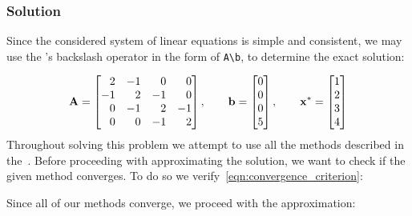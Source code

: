 \subsubsection*{Solution}
Since the considered system of linear equations is simple and consistent, we may use the
\MATLAB's backslash operator in the form of \lstinline[style=Matlab-editor]{A\b}, to
determine the exact solution:

\begin{equation*}
  \mathbf{A} = \begin{bmatrix}
    \phantom{-}2 & -1 & \phantom{-}0 & \phantom{-}0 \\
    -1 & \phantom{-}2 & -1 & \phantom{-}0 \\
    \phantom{-}0 & -1 & \phantom{-}2 & -1 \\
    \phantom{-}0 & \phantom{-}0 & -1 & \phantom{-}2
  \end{bmatrix}, \qquad
  \mathbf{b} = \begin{bmatrix}
    0 \\
    0 \\
    0 \\
    5
  \end{bmatrix}, \qquad
  \mathbf{x}^* = \begin{bmatrix}
    1 \\
    2 \\
    3 \\
    4
  \end{bmatrix}
\end{equation*}
Throughout solving this problem we attempt to use all the methods described in
the~.
Before proceeding with approximating the solution, we want to check if the given method
converges.
To do so we verify~\autoref{eqn:convergence_criterion}:

Since all of our methods converge, we proceed with the approximation:

